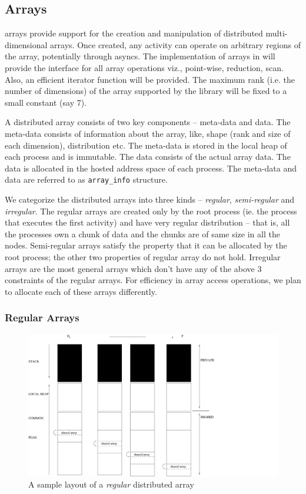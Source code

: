 \subsection{Arrays}

\Xten{} arrays provide support for the creation and manipulation of
distributed multi-dimensional arrays. Once created, any activity can
operate on arbitrary regions of the array, potentially through asyncs. The
implementation of \Xten{} arrays in \Xtenlib{} will provide the
interface for all \Xten{} array operations viz., point-wise, reduction,
scan. Also, an efficient iterator function will be provided. The maximum rank
(i.e. the number of dimensions) of the array supported by
the library will be fixed to a small constant (say 7). 

A distributed array consists of two key components -- meta-data and
data. The meta-data consists of information about the array, like,
shape (rank and size of each dimension), distribution etc. 
The meta-data is stored in the local heap of each process and
is immutable.
The data consists of the actual array data. The data is allocated
in the hosted address space of each process. The meta-data and
data are referred to as {\tt array\_info} structure.  

We categorize the distributed arrays into three kinds -- {\em regular},
{\em semi-regular} and {\em irregular}. The regular arrays are created
only by the root process (ie. the process that executes the first
activity) and have very regular distribution -- that is,
all the processes own a chunk of data and the chunks are of same size
in all the nodes. Semi-regular arrays satisfy the property that it can
be allocated by the root process; the other two properties of regular array
do not hold. Irregular arrays are the most
general arrays which don't have any of the above 3 constraints of the 
regular arrays. For efficiency in array access operations,
we plan to allocate each of these arrays differently.

\subsubsection{Regular Arrays}
\begin{figure}
\center
\includegraphics[scale=0.5]{figs/ARRAY-REGULAR.pdf}
\caption{A sample layout of a {\em regular} distributed array}
\label{fig:array_layout_regular}
\end{figure}

